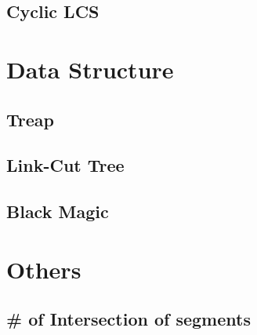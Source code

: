 \documentclass[a4paper,10pt,twocolumn,oneside]{article}
\begin{document}
\subsection{Cyclic LCS}


\section{Data Structure}

\subsection{Treap}


\subsection{Link-Cut Tree}


%

%

%

\subsection{Black Magic}


\section{Others}

%

%

\subsection{\# of Intersection of segments}

\end{document}
